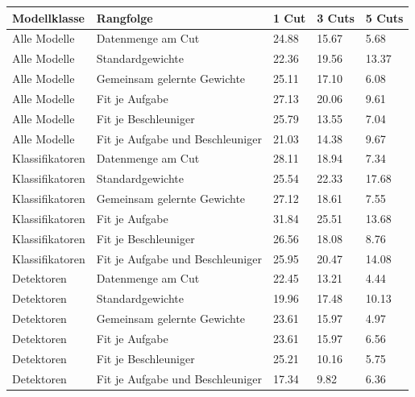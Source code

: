 \begin{tabular}{@{}lllll@{}}
\toprule
Modellklasse & Rangfolge & 1 Cut & 3 Cuts & 5 Cuts \\
\midrule
Alle Modelle & Datenmenge am Cut & 24.88 & 15.67 & 5.68 \\
Alle Modelle & Standardgewichte & 22.36 & 19.56 & 13.37 \\
Alle Modelle & Gemeinsam gelernte Gewichte & 25.11 & 17.10 & 6.08 \\
Alle Modelle & Fit je Aufgabe & 27.13 & 20.06 & 9.61 \\
Alle Modelle & Fit je Beschleuniger & 25.79 & 13.55 & 7.04 \\
Alle Modelle & Fit je Aufgabe und Beschleuniger & 21.03 & 14.38 & 9.67 \\
Klassifikatoren & Datenmenge am Cut & 28.11 & 18.94 & 7.34 \\
Klassifikatoren & Standardgewichte & 25.54 & 22.33 & 17.68 \\
Klassifikatoren & Gemeinsam gelernte Gewichte & 27.12 & 18.61 & 7.55 \\
Klassifikatoren & Fit je Aufgabe & 31.84 & 25.51 & 13.68 \\
Klassifikatoren & Fit je Beschleuniger & 26.56 & 18.08 & 8.76 \\
Klassifikatoren & Fit je Aufgabe und Beschleuniger & 25.95 & 20.47 & 14.08 \\
Detektoren & Datenmenge am Cut & 22.45 & 13.21 & 4.44 \\
Detektoren & Standardgewichte & 19.96 & 17.48 & 10.13 \\
Detektoren & Gemeinsam gelernte Gewichte & 23.61 & 15.97 & 4.97 \\
Detektoren & Fit je Aufgabe & 23.61 & 15.97 & 6.56 \\
Detektoren & Fit je Beschleuniger & 25.21 & 10.16 & 5.75 \\
Detektoren & Fit je Aufgabe und Beschleuniger & 17.34 & 9.82 & 6.36 \\
\bottomrule
\end{tabular}
